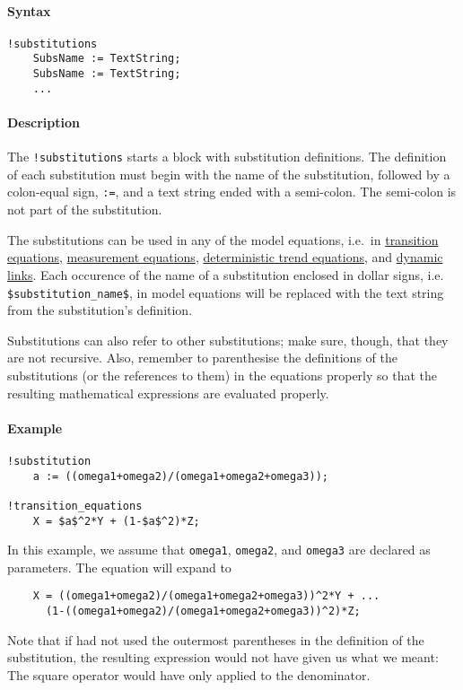 


	\paragraph{Syntax}\label{syntax}

\begin{verbatim}
!substitutions
    SubsName := TextString;
    SubsName := TextString;
    ...
\end{verbatim}

\paragraph{Description}\label{description}

The \texttt{!substitutions} starts a block with substitution
definitions. The definition of each substitution must begin with the
name of the substitution, followed by a colon-equal sign, \texttt{:=},
and a text string ended with a semi-colon. The semi-colon is not part of
the substitution.

The substitutions can be used in any of the model equations, i.e.~in
\href{modellang/transitionequations}{transition equations},
\href{modellang/measurementequations}{measurement equations},
\href{modellang/dtrends}{deterministic trend equations}, and
\href{modellang/links}{dynamic links}. Each occurence of the name of a
substitution enclosed in dollar signs, i.e.
\texttt{\$substitution\_name\$}, in model equations will be replaced
with the text string from the substitution's definition.

Substitutions can also refer to other substitutions; make sure, though,
that they are not recursive. Also, remember to parenthesise the
definitions of the substitutions (or the references to them) in the
equations properly so that the resulting mathematical expressions are
evaluated properly.

\paragraph{Example}\label{example}

\begin{verbatim}
!substitution
    a := ((omega1+omega2)/(omega1+omega2+omega3));

!transition_equations
    X = $a$^2*Y + (1-$a$^2)*Z;
\end{verbatim}

In this example, we assume that \texttt{omega1}, \texttt{omega2}, and
\texttt{omega3} are declared as parameters. The equation will expand to

\begin{verbatim}
    X = ((omega1+omega2)/(omega1+omega2+omega3))^2*Y + ...
      (1-((omega1+omega2)/(omega1+omega2+omega3))^2)*Z;
\end{verbatim}

Note that if had not used the outermost parentheses in the definition of
the substitution, the resulting expression would not have given us what
we meant: The square operator would have only applied to the
denominator.


